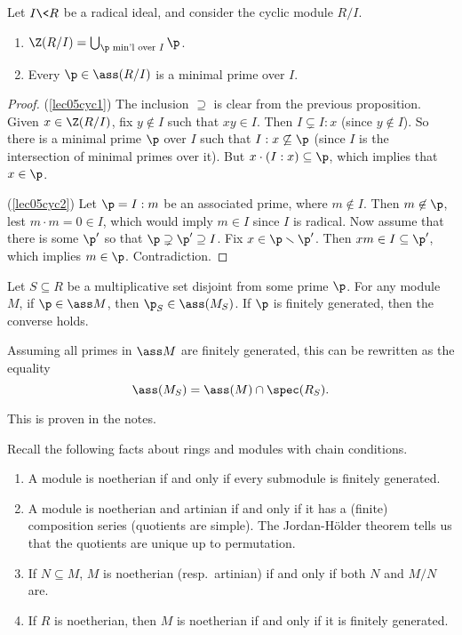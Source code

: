  \begin{theorem}\label{lec05radNOembedded}
   Let $I\< R$ be a radical ideal, and consider the cyclic module $R/I$.
   \begin{enumerate}
     \item \label{lec05cyc1} $\Z(R/I) = \bigcup_{\p\text{ min'l over } I} \p$.
     \item \label{lec05cyc2} Every $\p\in \ass (R/I)$ is a minimal prime over $I$.
   \end{enumerate}
 \end{theorem}
 \begin{proof}
   (\ref{lec05cyc1}) The inclusion $\supseteq$ is clear from the previous proposition.
   Given $x\in \Z(R/I)$, fix $y\not\in I$ such that $xy\in I$. Then $I\subsetneq I:x$
   (since $y\not\in I$). So there is a minimal prime $\p$ over $I$ such that
   $I:x\not\subseteq \p$ (since $I$ is the intersection of minimal primes over it). But
   $x\cdot (I:x)\subseteq \p$, which implies that $x\in \p$.

   (\ref{lec05cyc2}) Let $\p=I:m$ be an associated prime, where $m\not\in I$. Then
   $m\not\in \p$, lest $m\cdot m=0\in I$, which would imply $m\in I$ since $I$ is
   radical. Now assume that there  is some $\p'$ so that $\p\supsetneq \p'\supseteq I$.
   Fix $x\in \p\smallsetminus \p'$. Then $xm\in I\subseteq \p'$, which implies $m\in \p$.
   Contradiction.
 \end{proof}

 \begin{proposition}
   Let $S\subseteq R$ be a multiplicative set disjoint from some prime $\p$. For any
   module $M$, if $\p\in \ass M$, then $\p_S\in \ass (M_S)$. If $\p$ is finitely
   generated, then the converse holds.
 \end{proposition}
 Assuming all primes in $\ass M$ are finitely generated, this can be rewritten as the
 equality
 \[
    \ass (M_S) = \ass(M) \cap \spec (R_S).
 \]

 This is proven in the notes. \anton{}
 \setcounter{lecture}{6}

 \renewcommand\P{\mathcal{P}}

 Recall the following facts about rings and modules with chain conditions.
 \begin{enumerate}
   \item A module is noetherian if and only if every submodule is finitely generated.
   \item A module is noetherian and artinian if and only if it has a (finite) composition
   series (quotients are simple). The Jordan-H\"older theorem tells us that the quotients
   are unique up to permutation.
   \item If $N\subseteq M$, $M$ is noetherian (resp.\ artinian) if and only if both
   $N$ and $M/N$ are.
   \item If $R$ is noetherian, then $M$ is noetherian if and only if it is finitely
   generated.
 \end{enumerate}

